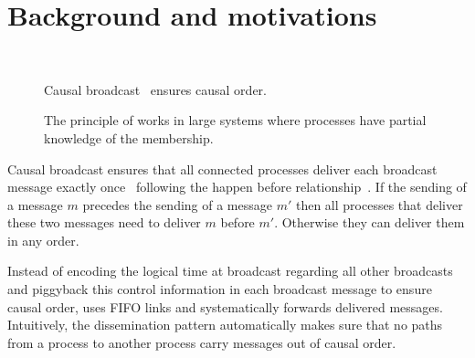 
\section{Background and motivations}
\label{sec:motivations}

\begin{figure*}
  \begin{center}
    \hspace{40pt}
    \hspace{40pt}
    \\
    \hspace{40pt}
    \caption{\label{fig:generalsolve}Causal broadcast~\cite{friedman2004causal}
      ensures causal order.}
  \end{center}
\end{figure*}


\begin{figure*}
  \begin{center}
    
    \caption{\label{fig:disseminationtree}The principle of
      \cite{friedman2004causal} works in large systems where processes have
      partial knowledge of the membership.}
  \end{center}
\end{figure*}

Causal broadcast ensures that all connected processes deliver each broadcast
message exactly once~\cite{hadzilacos1994modular} following the happen before
relationship~\cite{lamport1978time}. If the sending of a message $m$ precedes
the sending of a message $m'$ then all processes that deliver these two messages
need to deliver $m$ before $m'$. Otherwise they can deliver them in any order.

Instead of encoding the logical time at broadcast regarding all other broadcasts
and piggyback this control information in each broadcast message to ensure
causal order, \cite{friedman2004causal}
uses FIFO links and systematically forwards delivered messages.  Intuitively,
the dissemination pattern automatically makes sure that no paths from a process
to another process carry messages out of causal order.

